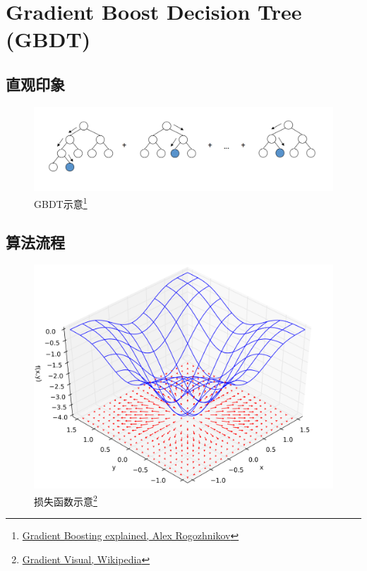 
\section{Gradient Boost Decision Tree (GBDT)}
\subsection{直观印象}
\begin{frame}
    \begin{figure}[!tb]
        \includegraphics[width=1.2\onepicwidth]{figure/gbdt/gbdt_attractive_picture}
        \caption{GBDT示意\footnote{
                 \href{http://arogozhnikov.github.io/2016/06/24/gradient_boosting_explained.html}{Gradient Boosting explained, Alex Rogozhnikov}}}
    \end{figure}
\end{frame}


\subsection{算法流程}
\begin{frame}
    \begin{figure}[!tb]
        \includegraphics[width=\onepicwidth]{figure/gbdt/Gradient_Visual}
        \caption{损失函数示意\footnote{
                 \href{https://en.wikipedia.org/wiki/File:Gradient_Visual.svg}{Gradient Visual, Wikipedia}}}
    \end{figure}
\end{frame}

